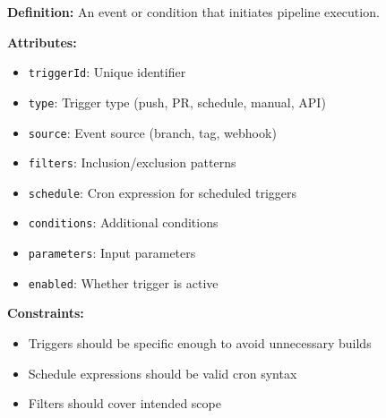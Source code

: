 \documentclass[11pt,letterpaper]{article}
\begin{document}
\begin{definitionbox}
\textbf{Definition:} An event or condition that initiates pipeline execution.

\textbf{Attributes:}
\begin{itemize}[nosep]
    \item \texttt{triggerId}: Unique identifier
    \item \texttt{type}: Trigger type (push, PR, schedule, manual, API)
    \item \texttt{source}: Event source (branch, tag, webhook)
    \item \texttt{filters}: Inclusion/exclusion patterns
    \item \texttt{schedule}: Cron expression for scheduled triggers
    \item \texttt{conditions}: Additional conditions
    \item \texttt{parameters}: Input parameters
    \item \texttt{enabled}: Whether trigger is active
\end{itemize}

\textbf{Constraints:}
\begin{itemize}[nosep]
    \item Triggers should be specific enough to avoid unnecessary builds
    \item Schedule expressions should be valid cron syntax
    \item Filters should cover intended scope
\end{itemize}
\end{definitionbox}
\end{document}
